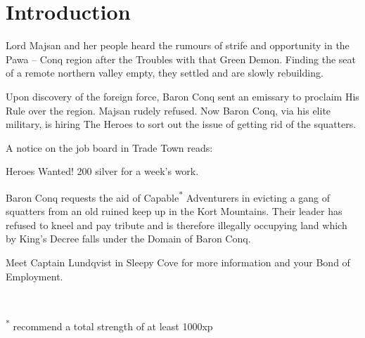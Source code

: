 
\section*{Introduction}
Lord Majsan and her people heard the rumours of strife and opportunity in the Pawa -- Conq region after the Troubles with that Green Demon. Finding the seat of a remote northern valley empty, they settled and are slowly rebuilding.

Upon discovery of the foreign force, Baron Conq sent an emissary to proclaim His Rule over the region. Majsan rudely refused. Now Baron Conq, via his elite military, is hiring The Heroes to sort out the issue of getting rid of the squatters.

\vspace{1.0\baselineskip}


\noindent\begin{minipage}{\textwidth}
\noindent A notice on the job board in Trade Town reads:


\begin{readoutloud}
Heroes Wanted! 200 silver for a week's work.

Baron Conq requests the aid of Capable\textsuperscript{*} Adventurers in evicting a gang of squatters from an old ruined keep up in the Kort Mountains. Their leader has refused to kneel and pay tribute and is therefore illegally occupying land which by King's Decree falls under the Domain of Baron Conq.

Meet Captain Lundqvist in Sleepy Cove for more information and your Bond of Employment.

\

\noindent
\textsuperscript{*} \small recommend a total strength of at least 1000xp \normalsize
\end{readoutloud}
\end{minipage}

